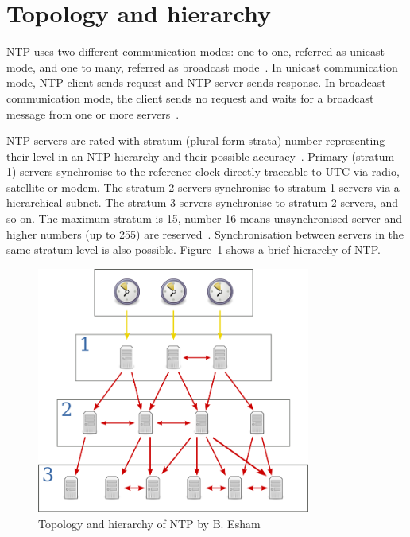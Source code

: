 
\section{Topology and hierarchy}\label{sec:ntp-topology}
NTP uses two different communication modes:
one to one, referred as unicast mode, and one to many, referred as broadcast mode~\cite{rfc5905}.
In unicast communication mode, NTP client sends request and NTP server sends response.
In broadcast communication mode, the client sends no request
and waits for a broadcast message from one or more servers~\cite{rfc5905}.

NTP servers are rated with stratum (plural form strata) number representing their level
in an NTP hierarchy and their possible accuracy~\cite{rfc5905}.
Primary (stratum 1) servers synchronise to the reference clock directly traceable to UTC via
radio, satellite or modem.
The stratum 2 servers synchronise to stratum 1
servers via a hierarchical subnet.
The stratum 3 servers synchronise to stratum 2 servers, and so on.
The maximum stratum is 15, number 16 means unsynchronised server
and higher numbers (up to 255) are reserved~\cite{rfc5905}.
Synchronisation between servers in the same stratum level is also possible.
Figure~\ref{fig:ntp-hierarchy} shows a brief hierarchy of NTP.
\begin{figure}
  \centering
  \includegraphics[width=9cm,keepaspectratio]{fig/Network_Time_Protocol_servers_and_clients.pdf}
  \caption{Topology and hierarchy of NTP by B. Esham}
  \label{fig:ntp-hierarchy}
  \bigskip
\end{figure}
